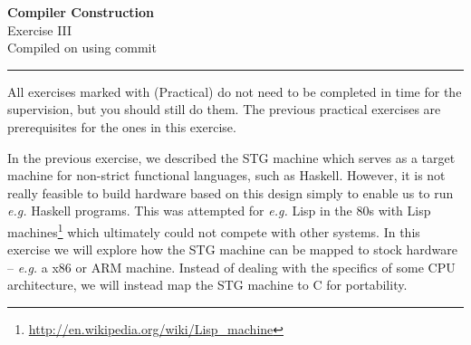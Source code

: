 \documentclass[10pt,a4paper]{exam} %
\begin{document}
	


\newcommand{\course}{Compiler Construction}
\newcommand{\week}{III}
\newcommand{\topics}{}

\everymath{\color{campurpledark}}
\everydisplay{\color{campurpledark}}




\marksnotpoints
\pointsdroppedatright
\marksnotpoints
\marginpointname{ \points}

\immediate{}
\immediate{}

\begin{center}
\LARGE {\textbf{\color{campurpledark} \course} }\\[-0.2cm]
\Large \color{campurpledark} Exercise \week\\
{
	\footnotesize Compiled on  using commit 
}
\end{center}

{\color{campurple}\hrule}

\newcommand{\terminal}[1]{\texttt{\color{campurple}#1}}
\newcommand{\bl}[1]{{\color{black}#1}}

\vspace{0.5cm}

All exercises marked with (Practical) do not need to be completed in time for the supervision, but you should still do them. The previous practical exercises are prerequisites for the ones in this exercise.

In the previous exercise, we described the STG machine which serves as a target machine for non-strict functional languages, such as Haskell. However, it is not really feasible to build hardware based on this design simply to enable us to run \emph{e.g.} Haskell programs. This was attempted for \emph{e.g.} Lisp in the 80s with Lisp machines\footnote{\url{http://en.wikipedia.org/wiki/Lisp_machine}} which ultimately could not compete with other systems. In this exercise we will explore how the STG machine can be mapped to stock hardware -- \emph{e.g.} a x86 or ARM machine. Instead of dealing with the specifics of some CPU architecture, we will instead map the STG machine to C for portability. 
\end{document}
